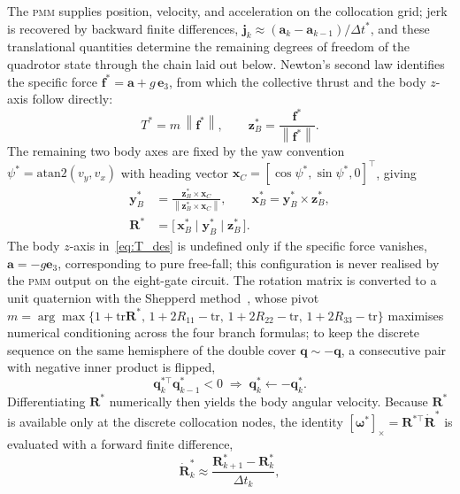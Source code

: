 \documentclass{ieeeaccess}
\newcommand{\norm}[1]{\left\| #1 \right\|}
\newcommand{\vect}[1]{\bm{#1}}
\newcommand{\mat}[1]{\mathbf{#1}}
\newcommand{\dt}{\Delta t}
\newcommand{\pmm}{\textsc{pmm}}
\begin{document}
The \pmm{} supplies position, velocity, and acceleration on the
collocation grid; jerk is recovered by backward finite differences,
$\vect{j}_k\approx(\vect{a}_k-\vect{a}_{k-1})/\dt^*$, and these
translational quantities determine the remaining degrees of freedom of
the quadrotor state through the chain laid out below.
Newton's second law identifies the specific force
$\vect{f}^*=\vect{a}+g\,\vect{e}_3$, from which the collective thrust and
the body $z$-axis follow directly:
\begin{equation}
  T^*=m\,\norm{\vect{f}^*},\qquad
  \vect{z}_B^*=\frac{\vect{f}^*}{\norm{\vect{f}^*}}.
  \label{eq:T_des}
\end{equation}
The remaining two body axes are fixed by the yaw convention
$\psi^*=\mathrm{atan2}(v_y,v_x)$ with heading vector
$\vect{x}_C=[\cos\psi^*,\sin\psi^*,0]^\top$, giving
\begin{align}
  \vect{y}_B^* &= \frac{\vect{z}_B^*\times\vect{x}_C}
                        {\norm{\vect{z}_B^*\times\vect{x}_C}},\qquad
  \vect{x}_B^* = \vect{y}_B^*\times\vect{z}_B^*,\nonumber\\
  \mat{R}^* &= \bigl[\,\vect{x}_B^*\;\big|\;\vect{y}_B^*\;\big|\;
               \vect{z}_B^*\,\bigr].
  \label{eq:R_des}
\end{align}
The body $z$-axis in~\eqref{eq:T_des} is undefined only if the specific
force vanishes, $\vect{a}=-g\vect{e}_3$, corresponding to pure
free-fall; this configuration is never realised by the \pmm{} output on
the eight-gate circuit.
The rotation matrix is converted to a unit quaternion with the
Shepperd method~\cite{shepperd1978quaternion}, whose pivot
$m=\arg\max\{1+\mathrm{tr}\mat{R}^*,\,1+2R_{11}-\mathrm{tr},\,
             1+2R_{22}-\mathrm{tr},\,1+2R_{33}-\mathrm{tr}\}$
maximises numerical conditioning across the four branch formulas; to
keep the discrete sequence on the same hemisphere of the double cover
$\vect{q}\sim-\vect{q}$, a consecutive pair with negative inner product
is flipped,
\begin{equation}
  \vect{q}_k^{*\top}\vect{q}_{k-1}^*<0
  \;\Rightarrow\;
  \vect{q}_k^*\leftarrow-\vect{q}_k^*.
  \label{eq:hemisphere}
\end{equation}
Differentiating $\mat{R}^*$ numerically then yields the body angular
velocity.
Because $\mat{R}^*$ is available only at the discrete collocation
nodes, the identity $[\vect{\omega}^*]_\times=\mat{R}^{*\top}\dot{\mat{R}}^*$
is evaluated with a forward finite difference,
\begin{equation}
  \dot{\mat{R}}_k^*\approx\frac{\mat{R}_{k+1}^*-\mat{R}_k^*}{\dt_k},
  \label{eq:Rdot}
\end{equation}
\end{document}
